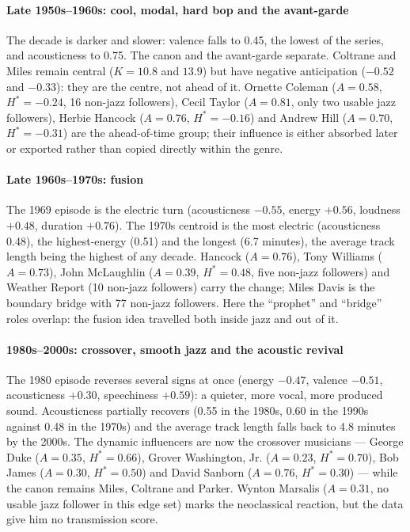 \documentclass[11pt]{article}
\begin{document}
\paragraph{Late 1950s--1960s: cool, modal, hard bop and the avant-garde}
The decade is darker and slower: valence falls to 0.45, the lowest of the series, and acousticness
to 0.75.
The canon and the avant-garde separate.
Coltrane and Miles remain central ($K=10.8$ and $13.9$) but have negative anticipation
($-0.52$ and $-0.33$): they are the centre, not ahead of it.
Ornette Coleman ($A=0.58$, $H^*=-0.24$, 16 non-jazz followers), Cecil Taylor ($A=0.81$, only two
usable jazz followers), Herbie Hancock ($A=0.76$, $H^*=-0.16$) and Andrew Hill ($A=0.70$,
$H^*=-0.31$) are the ahead-of-time group; their influence is either absorbed later or exported
rather than copied directly within the genre.

\paragraph{Late 1960s--1970s: fusion}
The 1969 episode is the electric turn (acousticness $-0.55$, energy $+0.56$, loudness $+0.48$,
duration $+0.76$).
The 1970s centroid is the most electric (acousticness 0.48), the highest-energy (0.51) and the
longest (6.7 minutes), the average track length being the highest of any decade.
Hancock ($A=0.76$), Tony Williams ($A=0.73$), John McLaughlin ($A=0.39$, $H^*=0.48$, five non-jazz
followers) and Weather Report (10 non-jazz followers) carry the change; Miles Davis is the
boundary bridge with 77 non-jazz followers.
Here the ``prophet'' and ``bridge'' roles overlap: the fusion idea travelled both inside jazz and
out of it.

\paragraph{1980s--2000s: crossover, smooth jazz and the acoustic revival}
The 1980 episode reverses several signs at once (energy $-0.47$, valence $-0.51$, acousticness
$+0.30$, speechiness $+0.59$): a quieter, more vocal, more produced sound.
Acousticness partially recovers (0.55 in the 1980s, 0.60 in the 1990s against 0.48 in the 1970s)
and the average track length falls back to 4.8 minutes by the 2000s.
The dynamic influencers are now the crossover musicians --- George Duke ($A=0.35$, $H^*=0.66$),
Grover Washington, Jr. ($A=0.23$, $H^*=0.70$), Bob James ($A=0.30$, $H^*=0.50$) and David Sanborn
($A=0.76$, $H^*=0.30$) --- while the canon remains Miles, Coltrane and Parker.
Wynton Marsalis ($A=0.31$, no usable jazz follower in this edge set) marks the neoclassical
reaction, but the data give him no transmission score.
\end{document}
